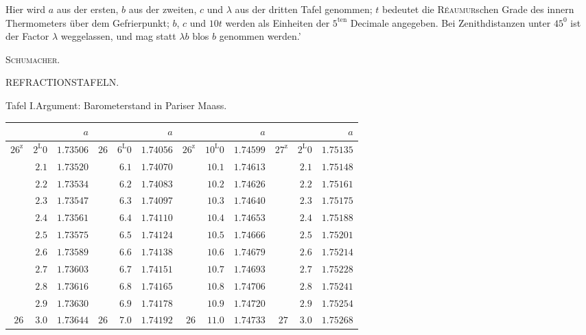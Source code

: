 Hier wird $a$ aus der ersten, $b$ aus der zweiten, $c$ und $\lambda$ aus der dritten Tafel genommen; $t$ bedeutet die \textsc{Réaumur}schen Grade des innern Thermometers über dem Gefrierpunkt; $b$, $c$ und $10t$ werden als Einheiten der $5^{\mathrm{ten}}$ Decimale angegeben. Bei Zenithdistanzen unter $45^0$ ist der Factor $\lambda$ weggelassen, und mag statt $\lambda b$ blos $b$ genommen werden.'
\begin{flushright}\textsc{Schumacher.}\end{flushright}
\clearpage{}%
\begin{center}
{\small REFRACTIONSTAFELN.\par}
\medskip
Tafel I.\quad Argument: Barometerstand in Pariser Maass.
\medskip

{\fontsize{9}{10.2}\selectfont\setlength{\tabcolsep}{3pt}
\begin{tabular}{rr|r||rr|r||rr|r||rr|r}
&&$a$&&&$a$&&&$a$&&&$a$\\\hline
$26^{\mathrm{z}}$ & $2^{\mathrm{L}}0$ & $1.73506$ & $26$ & $6^{\mathrm{L}}0$ & $1.74056$ & $26^{\mathrm{z}}$ & $10^{\mathrm{L}}0$ & $1.74599$ & $27^{\mathrm{z}}$ & $2^{\mathrm{L}}0$ & $1.75135$\\
 & $2.1$ & $1.73520$ &  & $6.1$ & $1.74070$ &  & $10.1$ & $1.74613$ &  & $2.1$ & $1.75148$\\
 & $2.2$ & $1.73534$ &  & $6.2$ & $1.74083$ &  & $10.2$ & $1.74626$ &  & $2.2$ & $1.75161$\\
 & $2.3$ & $1.73547$ &  & $6.3$ & $1.74097$ &  & $10.3$ & $1.74640$ &  & $2.3$ & $1.75175$\\
 & $2.4$ & $1.73561$ &  & $6.4$ & $1.74110$ &  & $10.4$ & $1.74653$ &  & $2.4$ & $1.75188$\\
 & $2.5$ & $1.73575$ &  & $6.5$ & $1.74124$ &  & $10.5$ & $1.74666$ &  & $2.5$ & $1.75201$\\
 & $2.6$ & $1.73589$ &  & $6.6$ & $1.74138$ &  & $10.6$ & $1.74679$ &  & $2.6$ & $1.75214$\\
 & $2.7$ & $1.73603$ &  & $6.7$ & $1.74151$ &  & $10.7$ & $1.74693$ &  & $2.7$ & $1.75228$\\
 & $2.8$ & $1.73616$ &  & $6.8$ & $1.74165$ &  & $10.8$ & $1.74706$ &  & $2.8$ & $1.75241$\\
 & $2.9$ & $1.73630$ &  & $6.9$ & $1.74178$ &  & $10.9$ & $1.74720$ &  & $2.9$ & $1.75254$\\[4pt]
$26$ & $3.0$ & $1.73644$ & $26$ & $7.0$ & $1.74192$ & $26$ & $11.0$ & $1.74733$ & $27$ & $3.0$ & $1.75268$\\

\end{tabular}}
\end{center}
